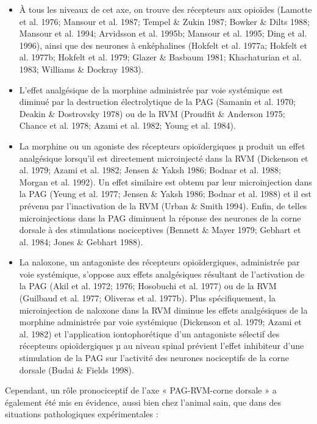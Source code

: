 \documentclass[a4paper,12pt,twoside]{report}
\begin{document}
\begin{itemize}
\item \`A tous les niveaux de cet axe, on trouve des récepteurs aux opioïdes (Lamotte et al. 1976; Mansour et al. 1987; Tempel \& Zukin 1987; Bowker \& Dilts 1988; Mansour et al. 1994; Arvidsson et al. 1995b; Mansour et al. 1995; Ding et al. 1996), ainsi que des neurones à enképhalines (Hokfelt et al. 1977a; Hokfelt et al. 1977b; Hokfelt et al. 1979; Glazer \& Basbaum 1981; Khachaturian et al. 1983; Williams \& Dockray 1983).
\item L’effet analgésique de la morphine administrée par voie systémique est diminué par la destruction électrolytique de la PAG (Samanin et al. 1970; Deakin \& Dostrovsky 1978) ou de la RVM (Proudfit \& Anderson 1975; Chance et al. 1978; Azami et al. 1982; Young et al. 1984).
\item La morphine ou un agoniste des récepteurs opioïdergiques µ produit un effet analgésique lorsqu’il est directement microinjecté dans la RVM (Dickenson et al. 1979; Azami et al. 1982; Jensen \& Yaksh 1986; Bodnar et al. 1988; Morgan et al. 1992). Un effet similaire est obtenu par leur microinjection dans la PAG (Yeung et al. 1977; Jensen \& Yaksh 1986; Bodnar et al. 1988) et il est prévenu par l’inactivation de la RVM (Urban \& Smith 1994). Enfin, de telles microinjections dans la PAG diminuent la réponse des neurones de la corne dorsale à des stimulations nociceptives (Bennett \& Mayer 1979; Gebhart et al. 1984; Jones \& Gebhart 1988).
\item La naloxone, un antagoniste des récepteurs opioïdergiques, administrée par voie systémique, s’oppose aux effets analgésiques résultant de l’activation de la PAG (Akil et al. 1972; 1976; Hosobuchi et al. 1977) ou de la RVM (Guilbaud et al. 1977; Oliveras et al. 1977b). Plus spécifiquement, la microinjection de naloxone dans la RVM diminue les effets analgésiques de la morphine administrée par voie systémique (Dickenson et al. 1979; Azami et al. 1982) et l’application iontophorétique d’un antagoniste sélectif des récepteurs opioïdergiques µ au niveau spinal prévient l’effet inhibiteur d’une stimulation de la PAG sur l’activité des neurones nociceptifs de la corne dorsale (Budai \& Fields 1998).
\end{itemize}

\bigskip

Cependant, un rôle pronociceptif de l’axe « PAG-RVM-corne dorsale » a également été mis en évidence, aussi bien chez l’animal sain, que dans des situations pathologiques expérimentales :
\end{document}
